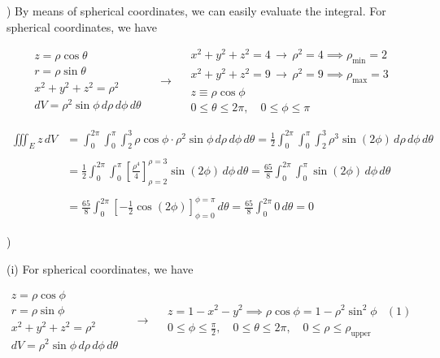 \documentclass{article}
\begin{document}
\hfill

) By means of spherical coordinates, we can easily evaluate the integral. For spherical coordinates, we have

\[
\begin{array}{c}
z=\rho\cos\theta\\
r=\rho\sin\theta\\
x^2+y^2+z^2=\rho^2\\
dV=\rho^2\sin\phi\,d\rho\,d\phi\,d\theta
\end{array}\quad\rightarrow\quad
\begin{array}{c}
x^2+y^2+z^2=4\,\rightarrow\,\rho^2 = 4\implies \rho_{\text{min}}=2\\
x^2+y^2+z^2=9\,\rightarrow\,\rho^2 = 9\implies \rho_{\text{max}}=3\\
z\equiv\rho\cos\phi\\
0\leq\theta\leq2\pi,\quad0\leq\phi\leq\pi
\end{array}
\]

\begin{align*}
\iiint_Ez\,dV&=\int_0^{2\pi}\int_0^\pi\int_2^3\rho\cos\phi\cdot\rho^2\sin\phi\,d\rho\,d\phi\,d\theta=\frac12\int_0^{2\pi}\int_0^\pi\int_2^3\rho^3\sin(2\phi)\,d\rho\,d\phi\,d\theta\\\\&=\frac12\int_0^{2\pi}\int_0^\pi\left[\frac{\rho^4}{4}\right]_{\rho=2}^{\rho=3}\sin(2\phi)\,d\phi\,d\theta=\frac{65}{8}\int_0^{2\pi}\int_0^\pi\sin(2\phi)\,d\phi\,d\theta\\\\&=\frac{65}{8}\int_0^{2\pi}\left[-\frac12\cos(2\phi)\right]_{\phi=0}^{\phi=\pi}\,d\theta=\frac{65}{8}\int_0^{2\pi}0\,d\theta =\boxed0
\end{align*}

\newpage

)

\hfill

\noindent (i) For spherical coordinates, we have

\[
\begin{array}{c}
z=\rho\cos\phi\\
r=\rho\sin\phi\\
x^2+y^2+z^2=\rho^2\\
dV=\rho^2\sin\phi\,d\rho\,d\phi\,d\theta
\end{array}\quad\rightarrow\quad
\begin{array}{cc}
z=1-x^2-y^2\implies\rho\cos\phi=1-\rho^2\sin^2\phi&(1)\\[0.3cm]
\displaystyle0\leq\phi\leq\frac\pi2,\quad0\leq\theta\leq2\pi,\quad0\leq\rho\leq\rho_{\text{upper}}
\end{array}
\]
\end{document}
